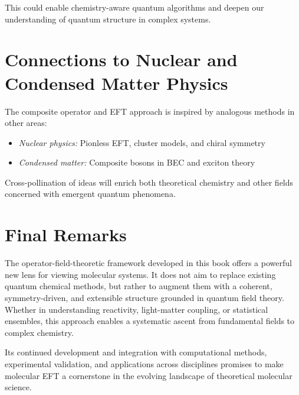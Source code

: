 This could enable chemistry-aware quantum algorithms and deepen our understanding of quantum structure in complex systems.

\section{Connections to Nuclear and Condensed Matter Physics}

The composite operator and EFT approach is inspired by analogous methods in other areas:
\begin{itemize}
  \item \emph{Nuclear physics:} Pionless EFT, cluster models, and chiral symmetry
  \item \emph{Condensed matter:} Composite bosons in BEC and exciton theory
\end{itemize}

Cross-pollination of ideas will enrich both theoretical chemistry and other fields concerned with emergent quantum phenomena.

\section*{Final Remarks}

The operator-field-theoretic framework developed in this book offers a powerful new lens for viewing molecular systems. It does not aim to replace existing quantum chemical methods, but rather to augment them with a coherent, symmetry-driven, and extensible structure grounded in quantum field theory. Whether in understanding reactivity, light-matter coupling, or statistical ensembles, this approach enables a systematic ascent from fundamental fields to complex chemistry.

Its continued development and integration with computational methods, experimental validation, and applications across disciplines promises to make molecular EFT a cornerstone in the evolving landscape of theoretical molecular science.

